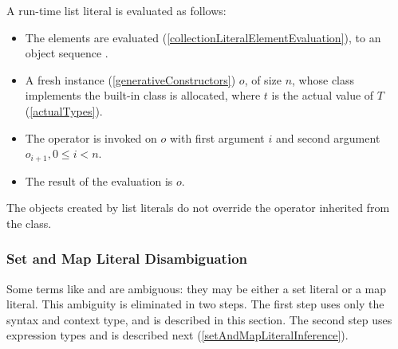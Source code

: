 \documentclass[makeidx]{article}
\begin{document}
{

\LMHash{}%
A run-time list literal
is evaluated as follows:

\begin{itemize}
\item
  The elements  are evaluated
  (\ref{collectionLiteralElementEvaluation}),
  to an object sequence .
\item
  A fresh instance (\ref{generativeConstructors}) $o$, of size $n$,
  whose class implements the built-in class 
  is allocated,
  where $t$ is the actual value of $T$
  (\ref{actualTypes}).
\item
  The operator \lit{[]=} is invoked on $o$ with
  first argument $i$ and second argument
  $o_{i+1}, 0 \le i < n$.
\item
  The result of the evaluation is $o$.
\end{itemize}

\LMHash{}%
The objects created by list literals do not override
the \lit{==} operator inherited from the  class.



\subsubsection{Set and Map Literal Disambiguation}

\LMHash{}%
Some terms like \code{\{\}} and  are ambiguous:
they may be either a set literal or a map literal.
This ambiguity is eliminated in two steps.
The first step uses only the syntax and context type,
and is described in this section.
The second step uses expression types and is described next
(\ref{setAndMapLiteralInference}).

}
\end{document}
